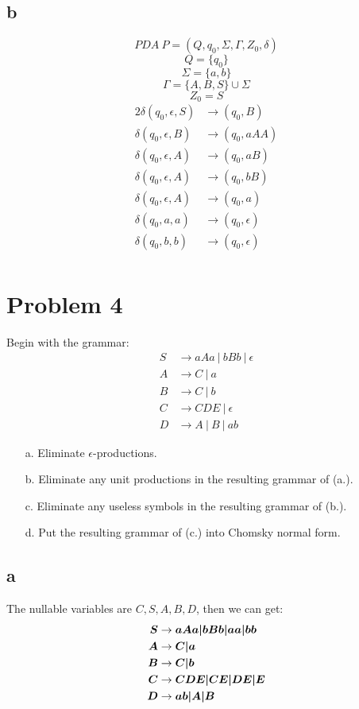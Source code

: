 \documentclass[a4paper,UTF8]{ctexart}
\theoremstyle{definition}
\begin{document}
\subsection*{b}
\[PDA\ P=(Q,q_0,\Sigma,\Gamma,Z_0,\delta)\]
\[Q=\{q_0\} \]
\[\Sigma = \{a,b\}\]
\[\Gamma = \{A,B,S\} \cup \Sigma\]  
\[Z_0 = S\]
\newcommand{\f}[2]{\delta(#1) &\rightarrow (#2)}
\begin{alignat*}{2}
  \f{q_0,\epsilon,S}{q_0,B}\\
  \f{q_0,\epsilon,B}{q_0,aAA}\\
  \f{q_0,\epsilon,A}{q_0,aB}\\
  \f{q_0,\epsilon,A}{q_0,bB}\\
  \f{q_0,\epsilon,A}{q_0,a}\\
  \f{q_0,a,a}{q_0,\epsilon}\\
  \f{q_0,b,b}{q_0,\epsilon}\\
\end{alignat*}


\section*{Problem 4}
Begin with the grammar:
\[
	\begin{aligned}
		S & \rightarrow aAa\ |\ bBb\ |\ \epsilon \\
		A & \rightarrow C \ |\ a                 \\
		B & \rightarrow C \ |\ b                 \\
		C & \rightarrow CDE\ |\ \epsilon         \\
		D & \rightarrow A\ |\ B\ |\ ab
	\end{aligned}
\]
\begin{enumerate}
	\item[a.] Eliminate $\epsilon$-productions.
	\item[b.] Eliminate any unit productions in the resulting grammar of (a.).
	\item[c.] Eliminate any useless symbols in the resulting grammar of (b.).
	\item[d.] Put the resulting grammar of (c.) into Chomsky normal form.
\end{enumerate}

\subsection*{a}
The nullable variables are $C,S,A,B,D$, then we can get:
\begin{alignat*}{2}
  \boldsymbol{S} &\rightarrow \boldsymbol{aAa|bBb|aa|bb}\\
  \boldsymbol{A} &\rightarrow \boldsymbol{C|a}\\
  \boldsymbol{B} &\rightarrow \boldsymbol{C|b}\\
  \boldsymbol{C} &\rightarrow \boldsymbol{CDE|CE|DE|E}\\
  \boldsymbol{D} &\rightarrow \boldsymbol{ab|A|B}
\end{alignat*}
\end{document}

